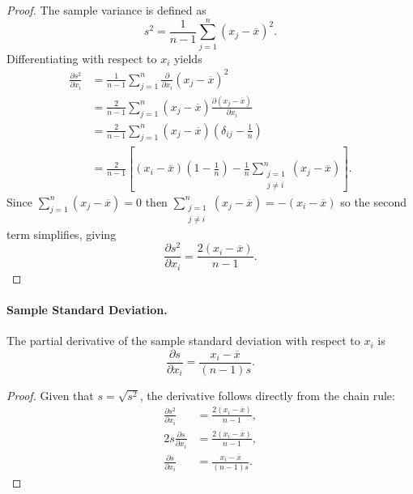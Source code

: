 \begin{proof}
    The sample variance is defined as
    \[
        s^2 = \frac{1}{n-1} \sum_{j=1}^{n} {(x_j - \overline{x})}^2.
    \]
    Differentiating with respect to \(x_i\) yields
    \begin{align*}
        \frac{\partial s^2}{\partial x_i}
         & = \frac{1}{n-1} \sum_{j=1}^{n}
        \frac{\partial}{\partial x_i} {(x_j - \overline{x})}^2                         \\
         & = \frac{2}{n-1} \sum_{j=1}^{n}
        (x_j - \overline{x}) \frac{\partial (x_j - \overline{x})}{\partial x_i}        \\
         & = \frac{2}{n-1} \sum_{j=1}^{n}
        (x_j - \overline{x}) \left( \delta_{ij} - \frac{1}{n} \right)                  \\
         & = \frac{2}{n-1} \left[ (x_i - \overline{x})\!\left( 1 - \frac{1}{n} \right)
        - \frac{1}{n} \sum_{\substack{j=1                                              \\ j \ne i}}^{n} (x_j - \overline{x}) \right].
    \end{align*}
    Since \(\sum_{j=1}^{n} (x_j - \overline{x}) = 0\) then \(\sum_{\substack{j=1 \\ j \ne i}}^{n} (x_j - \overline{x}) = - (x_i - \overline{x})\) so the second term simplifies, giving
    \[
        \frac{\partial s^2}{\partial x_i}
        = \frac{2(x_i - \overline{x})}{n-1}.
    \]
\end{proof}

\paragraph{Sample Standard Deviation.}

The partial derivative of the sample standard deviation with respect to \(x_i\)
is
\begin{equation}
    \frac{\partial s}{\partial x_i} = \frac{x_i - \overline{x}}{(n-1)s}.
    \label{eq:sample_std_derivative}
\end{equation}

\begin{proof}
    Given that \(s = \sqrt{s^2}\), the derivative follows directly from the chain rule:
    \begin{align*}
        \frac{\partial s^2}{\partial x_i}  & = \frac{2(x_i - \overline{x})}{n-1}, \\
        2s \frac{\partial s}{\partial x_i} & = \frac{2(x_i - \overline{x})}{n-1}, \\
        \frac{\partial s}{\partial x_i}    & = \frac{x_i - \overline{x}}{(n-1)s}.
    \end{align*}
\end{proof}

